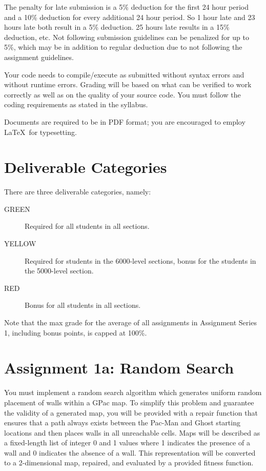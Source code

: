 \documentclass{article}
\begin{document}
The penalty for late submission is a 5\% deduction for the first 24 hour period and a 10\% deduction for every additional 24 hour period. So 1 hour late and 23 hours late both result in a 5\% deduction. 25 hours late results in a 15\% deduction, etc. Not following submission guidelines can be penalized for up to 5\%, which may be in addition to regular deduction due to not following the assignment guidelines.

Your code needs to compile/execute as submitted without syntax errors and without runtime errors. Grading will be based on what can be verified to work correctly as well as on the quality of your source code. You must follow the coding requirements as stated in the syllabus.

Documents are required to be in PDF format; you are encouraged to employ \LaTeX~for typesetting.


\section*{Deliverable Categories}
There are three deliverable categories, namely:
\begin{description}
\item[GREEN] Required for all students in all sections.
\item[YELLOW] Required for students in the 6000-level sections, bonus for the students in the 5000-level section.
\item[RED] Bonus for all students in all sections.
\end{description}
Note that the max grade for the average of all assignments in Assignment Series 1, including bonus points, is capped at 100\%.

\newpage

\section*{Assignment 1a: Random Search}
You must implement a random search algorithm which generates uniform random placement of walls within a GPac map. To simplify this problem and guarantee the validity of a generated map, you will be provided with a repair function that ensures that a path always exists between the Pac-Man and Ghost starting locations and then places walls in all unreachable cells. Maps will be described as a fixed-length list of integer 0 and 1 values where 1 indicates the presence of a wall and 0 indicates the absence of a wall. This representation will be converted to a 2-dimensional map, repaired, and evaluated by a provided fitness function.
\end{document}
